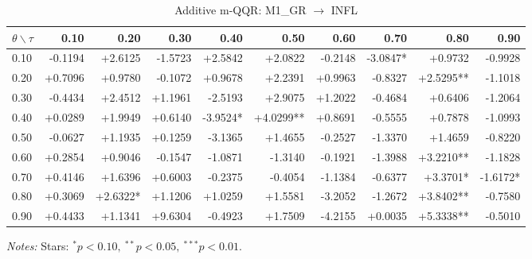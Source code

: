 \begin{table}[!htbp]
  \centering
  \caption{Additive m-QQR: M1_GR $\to$ INFL}
  \label{tab:amqqr_M1_GR}
  \begin{tabular}{lrrrrrrrrr}
    \toprule
    $\theta \backslash \tau$ & 0.10 & 0.20 & 0.30 & 0.40 & 0.50 & 0.60 & 0.70 & 0.80 & 0.90 \\
    \midrule
    0.10 & -0.1194 & +2.6125 & -1.5723 & +2.5842 & +2.0822 & -0.2148 & -3.0847* & +0.9732 & -0.9928 \\
    0.20 & +0.7096 & +0.9780 & -0.1072 & +0.9678 & +2.2391 & +0.9963 & -0.8327 & +2.5295** & -1.1018 \\
    0.30 & -0.4434 & +2.4512 & +1.1961 & -2.5193 & +2.9075 & +1.2022 & -0.4684 & +0.6406 & -1.2064 \\
    0.40 & +0.0289 & +1.9949 & +0.6140 & -3.9524* & +4.0299** & +0.8691 & -0.5555 & +0.7878 & -1.0993 \\
    0.50 & -0.0627 & +1.1935 & +0.1259 & -3.1365 & +1.4655 & -0.2527 & -1.3370 & +1.4659 & -0.8220 \\
    0.60 & +0.2854 & +0.9046 & -0.1547 & -1.0871 & -1.3140 & -0.1921 & -1.3988 & +3.2210** & -1.1828 \\
    0.70 & +0.4146 & +1.6396 & +0.6003 & -0.2375 & -0.4054 & -1.1384 & -0.6377 & +3.3701* & -1.6172* \\
    0.80 & +0.3069 & +2.6322* & +1.1206 & +1.0259 & +1.5581 & -3.2052 & -1.2672 & +3.8402** & -0.7580 \\
    0.90 & +0.4433 & +1.1341 & +9.6304 & -0.4923 & +1.7509 & -4.2155 & +0.0035 & +5.3338** & -0.5010 \\
    \bottomrule
  \end{tabular}
  \par\medskip\footnotesize\textit{Notes:} Stars: $^*p<0.10,\ ^{**}p<0.05,\ ^{***}p<0.01$.
\end{table}